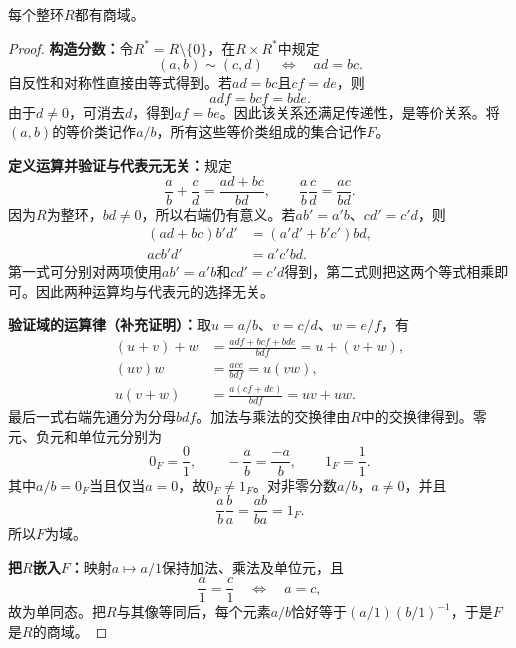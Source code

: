 \begin{theorem}\label{p2:fraction-field}
每个整环$R$都有商域。
\end{theorem}
\begin{proof}
\textbf{构造分数：}令$R^*=R\setminus\{0\}$，在$R\times R^*$中规定
\[
(a,b)\sim(c,d)\quad\Longleftrightarrow\quad ad=bc.
\]
自反性和对称性直接由等式得到。若$ad=bc$且$cf=de$，则
\[
adf=bcf=bde.
\]
由于$d\ne0$，可消去$d$，得到$af=be$。因此该关系还满足传递性，是等价关系。将$(a,b)$的等价类记作$a/b$，所有这些等价类组成的集合记作$F$。

\textbf{定义运算并验证与代表元无关：}规定
\[
\frac ab+\frac cd=\frac{ad+bc}{bd},\qquad
\frac ab\frac cd=\frac{ac}{bd}.
\]
因为$R$为整环，$bd\ne0$，所以右端仍有意义。若$ab'=a'b$、$cd'=c'd$，则
\begin{align*}
(ad+bc)b'd'&=(a'd'+b'c')bd,\\
acb'd'&=a'c'bd.
\end{align*}
第一式可分别对两项使用$ab'=a'b$和$cd'=c'd$得到，第二式则把这两个等式相乘即可。因此两种运算均与代表元的选择无关。

\textbf{验证域的运算律（补充证明）：}取$u=a/b$、$v=c/d$、$w=e/f$，有
\begin{align*}
(u+v)+w&=\frac{adf+bcf+bde}{bdf}=u+(v+w),\\
(uv)w&=\frac{ace}{bdf}=u(vw),\\
u(v+w)&=\frac{a(cf+de)}{bdf}=uv+uw.
\end{align*}
最后一式右端先通分为分母$bdf$。加法与乘法的交换律由$R$中的交换律得到。零元、负元和单位元分别为
\[
0_F=\frac01,\qquad -\frac ab=\frac{-a}{b},\qquad 1_F=\frac11.
\]
其中$a/b=0_F$当且仅当$a=0$，故$0_F\ne1_F$。对非零分数$a/b$，$a\ne0$，并且
\[
\frac ab\frac ba=\frac{ab}{ba}=1_F.
\]
所以$F$为域。

\textbf{把$R$嵌入$F$：}映射$a\mapsto a/1$保持加法、乘法及单位元，且
\[
\frac a1=\frac c1\quad\Longleftrightarrow\quad a=c,
\]
故为单同态。把$R$与其像等同后，每个元素$a/b$恰好等于$(a/1)(b/1)^{-1}$，于是$F$是$R$的商域。
\end{proof}

